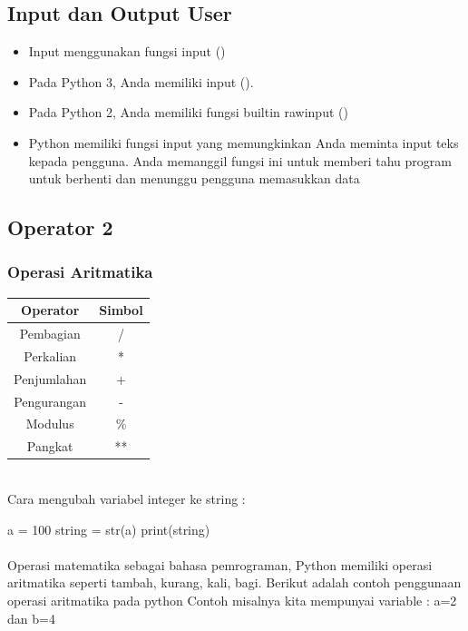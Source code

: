 \documentclass{article}
\begin{document}
\subsection{Input dan Output User}
\begin{itemize}
    \item Input menggunakan fungsi input ()
    \item Pada Python 3, Anda memiliki input ().
    \item Pada Python 2, Anda memiliki fungsi built\textunderscore in raw\textunderscore input ()
    \item Python memiliki fungsi input yang memungkinkan Anda meminta input teks kepada pengguna. Anda memanggil fungsi ini untuk memberi tahu program untuk berhenti dan menunggu pengguna memasukkan data
\end{itemize}

\subsection{Operator 2}
\subsubsection{Operasi Aritmatika}
\begin{table}[h]
    \centering
\begin{tabular}{|c|c|}
\hline
Operator & Simbol\\
\hline
Pembagian & /\\
\hline
Perkalian & *\\
\hline
Penjumlahan & +\\
\hline
Pengurangan & -\\
\hline
Modulus & \% \\
\hline
Pangkat & **\\
\hline
\end{tabular}
\end{table}\\
Cara mengubah variabel integer ke string :
\par
a = 100
string = str(a)
print(string)

\paragraph{}
Operasi matematika sebagai bahasa pemrograman, Python memiliki operasi aritmatika seperti tambah, kurang, kali, bagi. Berikut adalah contoh penggunaan operasi aritmatika pada python
Contoh misalnya kita mempunyai variable : a=2 dan b=4\\
\end{document}
